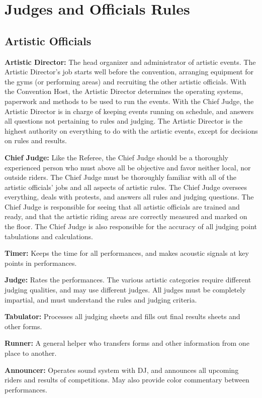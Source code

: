 \chapter{Judges and Officials Rules}

\section{Artistic Officials}
\textbf{Artistic Director:} The head organizer and administrator of artistic events.
The Artistic Director's job starts well before the convention, arranging equipment for the gyms (or performing areas) and recruiting the other artistic officials.
With the Convention Host, the Artistic Director determines the operating systems, paperwork and methods to be used to run the events.
With the Chief Judge, the Artistic Director is in charge of keeping events running on schedule, and answers all questions not pertaining to rules and judging.
The Artistic Director is the highest authority on everything to do with the artistic events, except for decisions on rules and results.

\textbf{Chief Judge:} Like the Referee, the Chief Judge should be a thoroughly experienced person who must above all be objective and favor neither local, nor outside riders.
The Chief Judge must be thoroughly familiar with all of the artistic officials' jobs and all aspects of artistic rules.
The Chief Judge oversees everything, deals with protests, and answers all rules and judging questions.
The Chief Judge is responsible for seeing that all artistic officials are trained and ready, and that the artistic riding areas are correctly measured and marked on the floor.
The Chief Judge is also responsible for the accuracy of all judging point tabulations and calculations.

\textbf{Timer:} Keeps the time for all performances, and makes acoustic signals at key points in performances.

\textbf{Judge:} Rates the performances.
The various artistic categories require different judging qualities, and may use different judges.
All judges must be completely impartial, and must understand the rules and judging criteria.

\textbf{Tabulator:} Processes all judging sheets and fills out final results sheets and other forms.

\textbf{Runner:} A general helper who transfers forms and other information from one place to another.

\textbf{Announcer:} Operates sound system with DJ, and announces all upcoming riders and results of competitions.
May also provide color commentary between performances.

